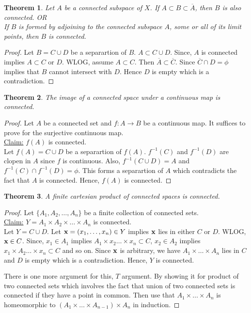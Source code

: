 \documentclass[12pt,reqno]{amsart}
\theoremstyle{plain}
\newtheorem{thm}{Theorem}
\theoremstyle{definition}
\begin{document}
\begin{thm}
    Let $A$ be a connected subspace of $X$. If $A \subset B \subset \overline{A}$, then $B$ is also connected. OR \\
    If $B$ is formed by adjoining to the connected subspace $A$, some or all of its limit points, then $B$ is connected.
\end{thm}
\begin{proof}
    Let $B = C \cup D$ be a separartion of $B$. $A \subset C \cup D$. Since, $A$ is connected implies $A \subset C$ or $D$. WLOG, assume $A \subset C$. Then $\overline{A} \subset \overline{C}$. Since $\overline{C} \cap D = \phi$ implies that $B$ cannot intersect with $D$. Hence $D$ is empty which is a contradiction.
\end{proof}
\begin{thm}
    The image of a connected space under a continuous map is connected.
\end{thm}
\begin{proof}
    Let $A$ be a connected set and $f \colon A \to B$ be a continuous map. It suffices to prove for the surjective continuous map.\\
    \underline{Claim:} $f(A)$ is connected.\\
    Let $f(A) = C \cup D$ be a separartion of $f(A)$. $f^{-1}(C)$ and $f^{-1}(D)$ are clopen in $A$ since $f$ is continuous. Also, $f^{-1}(C \cup D) = A$ and $f^{-1}(C) \cap f^{-1}(D) = \phi$. This forms a separartion of $A$ which contradicts the fact that $A$ is connected. Hence, $f(A)$ is connected.
\end{proof}
\begin{thm}
    A finite cartesian product of connected spaces is connected.
\end{thm}
\begin{proof}
    Let $\{A_1, A_2,\dots, A_n\}$ be a finite collection of connected sets. \\
    \underline{Claim:} $Y = A_1 \times A_2 \times \dots \times A_n$ is connected. \\
    Let $Y = C \cup D$. Let ${\bf x} = (x_1, \dots, x_n) \in Y$ implies ${\bf x}$ lies in either $C$ or $D$. WLOG, ${\bf x} \in C$. Since, $x_1 \in A_1$ implies $A_1 \times x_2 \dots \times x_n \subset C$, $x_2 \in A_2$ implies $x_1 \times A_2 \dots \times x_n \subset C$ and so on. Since ${\bf x}$ is arbitrary, we have $A_1 \times \dots \times A_n$ lies in $C$ and $D$ is empty which is a contradiction. Hence, $Y$ is connected.

    There is one more argument for this, $T$ argument. By showing it for product of two connected sets which involves the fact that union of two connected sets is connected if they have a point in common. Then use that $A_1 \times \dots \times A_n$ is homeomorphic to $(A_1 \times \dots \times A_{n-1}) \times A_n$ in induction.
\end{proof}
\end{document}
